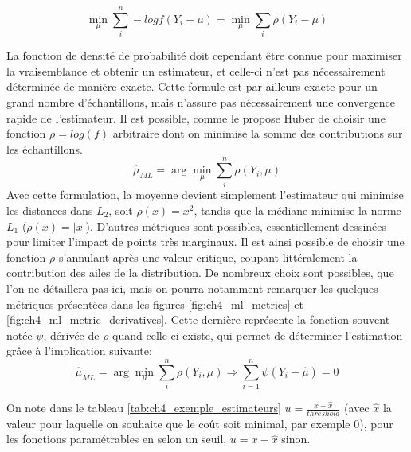 \begin{equation}
\min_{\mu} \sum\limits_{i}^{n} -log f(Y_i - \mu) = \min_{\mu} \sum\limits_{i} \rho(Y_i - \mu)
\end{equation}

La fonction de densité de probabilité doit cependant être connue pour maximiser la vraisemblance et obtenir un estimateur, et celle-ci n'est pas nécessairement déterminée de manière exacte. Cette formule est par ailleurs exacte pour un grand nombre d'échantillons, mais n'assure pas nécessairement une convergence rapide de l'estimateur. Il est possible, comme le propose Huber \cite{Huber1981} de choisir une fonction $\rho = log(f)$ arbitraire dont on minimise la somme des contributions sur les échantillons. 
\begin{equation}
\hat{\mu}_{ML} = \arg\min_\mu \sum\limits_{i}^{n} \rho(Y_i, \mu)
\end{equation}
Avec cette formulation, la moyenne devient simplement l'estimateur qui minimise les distances dans $L_2$, soit $\rho(x) = x^2$, tandis que la médiane minimise la norme $L_1$ ($\rho(x) = |x|$). D'autres métriques sont possibles, essentiellement dessinées pour limiter l'impact de points très marginaux. Il est ainsi possible de choisir une fonction $\rho$ s'annulant après une valeur critique, coupant littéralement la contribution des ailes de la distribution. De nombreux choix sont possibles, que l'on ne détaillera pas ici, mais on pourra notamment remarquer les quelques métriques présentées dans les figures \ref{fig:ch4_ml_metrics} et \ref{fig:ch4_ml_metric_derivatives}. Cette dernière représente la fonction souvent notée $\psi$, dérivée de $\rho$ quand celle-ci existe, qui permet de déterminer l'estimation grâce à l'implication suivante: 
\begin{equation}
\hat{\mu}_{ML} = \arg\min_\mu \sum\limits_{i}^{n} \rho(Y_i, \mu)  \Rightarrow \sum\limits_{i=1}^{n} \psi(Y_i - \hat{\mu}) = 0
\end{equation}

On note dans le tableau \ref{tab:ch4_exemple_estimateurs} $u = \frac{x - \hat{x}}{threshold}$ (avec $\hat{x}$ la valeur pour laquelle on souhaite que le coût soit minimal, par exemple 0), pour les fonctions paramétrables en selon un seuil, $u = x - \hat{x}$ sinon.

